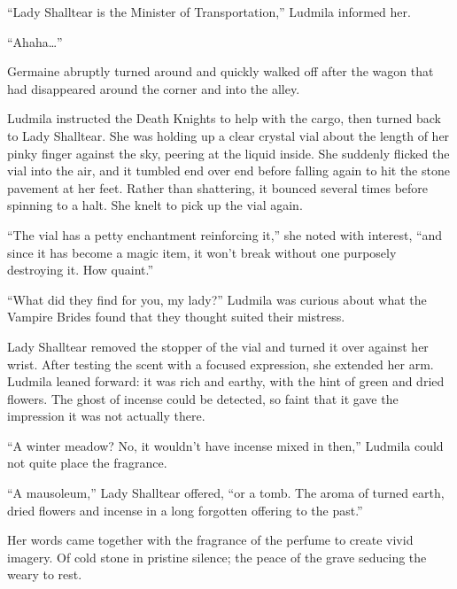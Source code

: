  

“Lady Shalltear is the Minister of Transportation,” Ludmila informed her.

 

“Ahaha…”

 

Germaine abruptly turned around and quickly walked off after the wagon that had disappeared around the corner and into the alley.

 

Ludmila instructed the Death Knights to help with the cargo, then turned back to Lady Shalltear. She was holding up a clear crystal vial about the length of her pinky finger against the sky, peering at the liquid inside. She suddenly flicked the vial into the air, and it tumbled end over end before falling again to hit the stone pavement at her feet. Rather than shattering, it bounced several times before spinning to a halt. She knelt to pick up the vial again.

 

“The vial has a petty enchantment reinforcing it,” she noted with interest, “and since it has become a magic item, it won’t break without one purposely destroying it. How quaint.”

 

“What did they find for you, my lady?” Ludmila was curious about what the Vampire Brides found that they thought suited their mistress.

 

Lady Shalltear removed the stopper of the vial and turned it over against her wrist. After testing the scent with a focused expression, she extended her arm. Ludmila leaned forward: it was rich and earthy, with the hint of green and dried flowers. The ghost of incense could be detected, so faint that it gave the impression it was not actually there.

 

“A winter meadow? No, it wouldn’t have incense mixed in then,” Ludmila could not quite place the fragrance.

 

“A mausoleum,” Lady Shalltear offered, “or a tomb. The aroma of turned earth, dried flowers and incense in a long forgotten offering to the past.”

 

Her words came together with the fragrance of the perfume to create vivid imagery. Of cold stone in pristine silence; the peace of the grave seducing the weary to rest.

